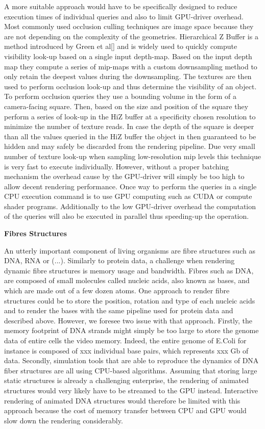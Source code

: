 A more suitable approach would have to be specifically designed to reduce execution times of individual queries and also to limit GPU-driver overhead.
Most commonly used occlusion culling techniques are image space because they are not depending on the complexity of the geometries.
Hierarchical Z Buffer is a method introduced by Green et al[] and is widely used to quickly compute visibility look-up based on a single input depth-map.
Based on the input depth map they compute a series of mip-maps with a custom downsampling method to only retain the deepest values during the downsampling.
The textures are then used to perform occlusion look-up and thus determine the visibility of an object.
To perform occlusion queries they use a bounding volume in the form of a camera-facing square.
Then, based on the size and position of the square they perform a series of look-up in the HiZ buffer at a specificity chosen resolution to minimize the number of texture reads.
In case the depth of the square is deeper than all the values queried in the HiZ buffer the object in then guaranteed to be hidden and may safely be discarded from the rendering pipeline.
Due very small number of texture look-up when sampling low-resolution mip levels this technique is very fast to execute individually.
However, without a proper batching mechanism the overhead cause by the GPU-driver will simply be too high to allow decent rendering performance.
Once way to perform the queries in a single CPU execution command is to use GPU computing such as CUDA or compute shader programs.
Additionally to the low GPU-driver overhead the computation of the queries will also be executed in parallel thus speeding-up the operation.
 
\textbf{Fibres Structures}

An utterly important component of living organisms are fibre structures such as DNA, RNA or (...).
Similarly to protein data, a challenge when rendering dynamic fibre structures is memory usage and bandwidth.
Fibres such as DNA, are composed of small molecules called nucleic acids, also known as bases, and which are made out of a few dozen atoms.
One approach to render fibre structures could be to store the position, rotation and type of each nucleic acids and to render the bases with the same pipeline used for protein data and described above.
However, we foresee two issue with that approach.
Firstly, the memory footprint of DNA strands might simply be too large to store the genome data of entire cells the video memory.
Indeed, the entire genome of E.Coli for instance is composed of xxx individual base pairs, which represents xxx Gb of data.
Secondly, simulation tools that are able to reproduce the dynamics of DNA fiber structures are all using CPU-based algorithms.
Assuming that storing large static structures is already a challenging enterprise, the rendering of animated structures would very likely have to be streamed to the GPU instead.
Interactive rendering of animated DNA structures would therefore be limited with this approach because the cost of memory transfer between CPU and GPU would slow down the rendering considerably.

